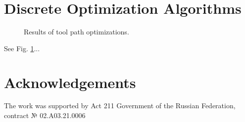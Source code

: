 \documentclass{../download/tPRS2e}
\begin{document}
\section{Discrete Optimization Algorithms}

\begin{figure}
\begin{center}
\caption{Results of tool path optimizations.} \label{nesting-results}
\end{center}
\end{figure}

See Fig. \ref{nesting-results}...

\section*{Acknowledgements}

The work was supported by Act 211 Government of the Russian Federation, contract № 02.A03.21.0006


\nocite{*}

\end{document}
